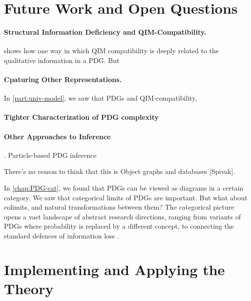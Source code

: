 \section{Future Work and Open Questions}

\paragraph{Structural Information Deficiency and QIM-Compatibility.}
 shows how one way in which QIM compatibility is deeply related to the qualitative information in a PDG.
But 

\paragraph{Cpaturing Other Representations.}
In \cref{part:univ-model}, we saw that PDGs and QIM-compatibility,


\paragraph{Tighter Characterization of PDG complexity}

\paragraph{Other Approaches to Inference}. 
 Particle-based PDG inference

There's no reason to think that this is 
Object graphs and databases [Spivak].

In \cref{chap:PDG-cat}, we found that PDGs can be viewed as diagrams in a certain category. We saw that categorical limits of PDGs are important. But what about colimits, and natural transformations between them? 
The categorical picture opens a vast landscape of abstract research directions, ranging from variants of PDGs where probability is replaced by a different concept, to connecting the standard defences of information loss \citep[Theorem ??]{leinster2021entropy}.


\section{Implementing and Applying the Theory}

